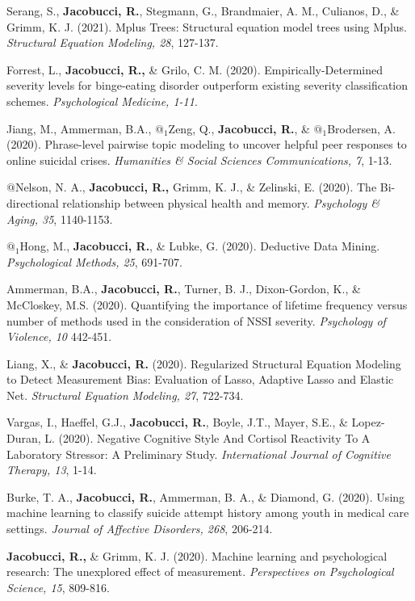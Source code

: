 \documentclass[letterpaper,10pt]{article}
\begin{document}
\begin{etaremune}
	\item  Serang, S., \textbf{Jacobucci, R.}, Stegmann, G., Brandmaier, A. M., Culianos, D., \& Grimm, K. J. (2021). Mplus Trees: Structural equation model trees using Mplus. \emph{Structural Equation Modeling, 28}, 127-137.
		\item Forrest, L., \textbf{Jacobucci, R.,} \& Grilo, C. M. (2020). Empirically-Determined severity levels for binge-eating disorder outperform existing severity classification schemes. \emph{Psychological Medicine, 1-11}.
		\item Jiang, M., Ammerman, B.A., $@_1$Zeng, Q., \textbf{Jacobucci, R.}, \& $@_1$Brodersen, A. (2020). Phrase-level pairwise topic modeling to uncover helpful peer responses to online suicidal crises. \emph{Humanities \& Social Sciences Communications, 7}, 1-13.
	\item $@$Nelson, N. A., \textbf{Jacobucci, R.,} Grimm, K. J., \& Zelinski, E. (2020). The Bi-directional relationship between physical health and memory. \emph{Psychology \& Aging, 35}, 1140-1153.
	\item  $@_1$Hong, M., \textbf{Jacobucci, R.}, \& Lubke, G. (2020). Deductive Data Mining. \emph{Psychological Methods, 25}, 691-707.
	\item  Ammerman, B.A., \textbf{Jacobucci, R.}, Turner, B. J., Dixon-Gordon, K., \& McCloskey, M.S. (2020). Quantifying the importance of lifetime frequency versus number of methods used in the consideration of NSSI severity. \emph{Psychology of Violence, 10} 442-451.
	\item Liang, X., \& \textbf{Jacobucci, R.} (2020). Regularized Structural Equation Modeling to Detect Measurement Bias: Evaluation of Lasso, Adaptive Lasso and Elastic Net. \emph{Structural Equation Modeling, 27}, 722-734.
	\item Vargas, I., Haeffel, G.J., \textbf{Jacobucci, R.}, Boyle, J.T., Mayer, S.E., \& Lopez-Duran, L. (2020). Negative Cognitive Style And Cortisol Reactivity To A Laboratory Stressor: A Preliminary Study. \emph{International Journal of Cognitive Therapy, 13}, 1-14. 
	\item Burke, T. A., \textbf{Jacobucci, R.}, Ammerman, B. A., \& Diamond, G. (2020). Using machine learning to classify suicide attempt history among youth in medical care settings. \emph{Journal of Affective Disorders, 268}, 206-214.
	\item  \textbf{Jacobucci, R.,} \& Grimm, K. J. (2020). Machine learning and psychological research: The unexplored effect of measurement. \emph{Perspectives on Psychological Science, 15}, 809-816.

\end{etaremune}
\end{document}
